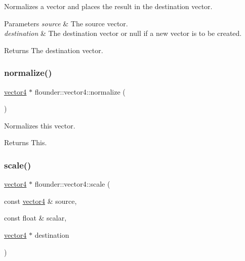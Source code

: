 Normalizes a vector and places the result in the destination vector. 


\begin{DoxyParams}{Parameters}
{\em source} & The source vector. \\
\hline
{\em destination} & The destination vector or null if a new vector is to be created. \\
\hline
\end{DoxyParams}
\begin{DoxyReturn}{Returns}
The destination vector. 
\end{DoxyReturn}
\mbox{\label{classflounder_1_1vector4_aa9eec0ab63428f78de24ac90f2a20206}} 
\subsubsection{\texorpdfstring{normalize()}{normalize()}\hspace{0.1cm}{\footnotesize\ttfamily [2/2]}}
{\footnotesize\ttfamily \hyperlink{classflounder_1_1vector4}{vector4} $\ast$ flounder\+::vector4\+::normalize (\begin{DoxyParamCaption}{ }\end{DoxyParamCaption})}



Normalizes this vector. 

\begin{DoxyReturn}{Returns}
This. 
\end{DoxyReturn}
\mbox{\label{classflounder_1_1vector4_a5b5371c3619896e32b0332a336a10ee3}} 
\subsubsection{\texorpdfstring{scale()}{scale()}\hspace{0.1cm}{\footnotesize\ttfamily [1/2]}}
{\footnotesize\ttfamily \hyperlink{classflounder_1_1vector4}{vector4} $\ast$ flounder\+::vector4\+::scale (\begin{DoxyParamCaption}\item[{const \hyperlink{classflounder_1_1vector4}{vector4} \&}]{source,  }\item[{const float \&}]{scalar,  }\item[{\hyperlink{classflounder_1_1vector4}{vector4} $\ast$}]{destination }\end{DoxyParamCaption})\hspace{0.3cm}{\ttfamily [static]}}



